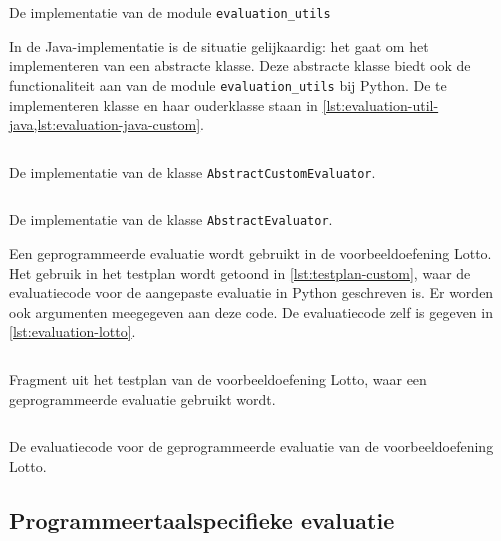 \begin{listing}
    \inputminted{python}{../../judge/src/tested/languages/python/templates/evaluation_utils.py}
    \caption{De implementatie van de module \texttt{evaluation\_utils}}
    \label{lst:evaluation-util-python}
\end{listing}

In de Java-implementatie is de situatie gelijkaardig: het gaat om het implementeren van een abstracte klasse.
Deze abstracte klasse biedt ook de functionaliteit aan van de module \texttt{evaluation\_utils} bij Python.
De te implementeren klasse en haar ouderklasse staan in \cref{lst:evaluation-util-java,lst:evaluation-java-custom}.

\begin{listing}
    \inputminted{java}{../../judge/src/tested/languages/java/templates/AbstractCustomEvaluator.java}
    \caption{De implementatie van de klasse \texttt{AbstractCustomEvaluator}.}
    \label{lst:evaluation-java-custom}
\end{listing}

\begin{listing}
    \inputminted{java}{../../judge/src/tested/languages/java/templates/AbstractEvaluator.java}
    \caption{De implementatie van de klasse \texttt{AbstractEvaluator}.}
    \label{lst:evaluation-util-java}
\end{listing}

Een geprogrammeerde evaluatie wordt gebruikt in de voorbeeldoefening Lotto.
Het gebruik in het testplan wordt getoond in \cref{lst:testplan-custom}, waar de evaluatiecode voor de aangepaste evaluatie in Python geschreven is.
Er worden ook argumenten meegegeven aan deze code.
De evaluatiecode zelf is gegeven in \cref{lst:evaluation-lotto}.

\begin{listing}
    \inputminted{java}{code/testplan-custom.json}
    \caption{Fragment uit het testplan van de voorbeeldoefening Lotto, waar een geprogrammeerde evaluatie gebruikt wordt.}
    \label{lst:testplan-custom}
\end{listing}

\begin{listing}
    \inputminted{python}{../../exercise/lotto/evaluation/evaluator.py}
    \caption{De evaluatiecode voor de geprogrammeerde evaluatie van de voorbeeldoefening Lotto.}
    \label{lst:evaluation-lotto}
\end{listing}

\subsection{Programmeertaalspecifieke evaluatie}\label{subsec:programmeertaalspecifieke-evaluatie}

